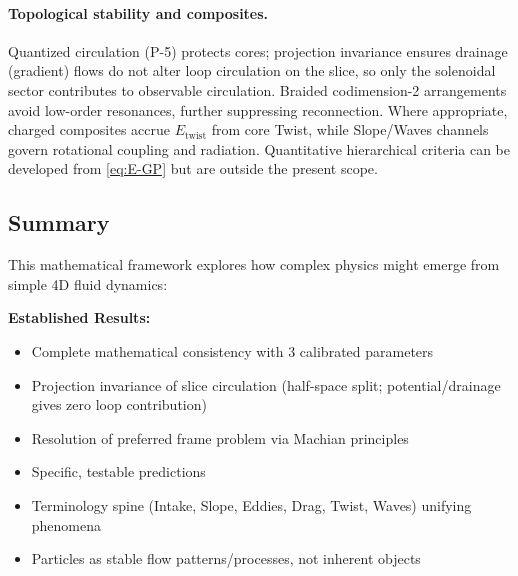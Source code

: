 \paragraph{Topological stability and composites.}
Quantized circulation (P-5) protects cores; projection invariance ensures drainage (gradient) flows do not alter loop circulation on the slice, so only the solenoidal sector contributes to observable circulation. Braided codimension-2 arrangements avoid low-order resonances, further suppressing reconnection. Where appropriate, charged composites accrue $E_{\text{twist}}$ from core Twist, while Slope/Waves channels govern rotational coupling and radiation. Quantitative hierarchical criteria can be developed from \eqref{eq:E-GP} but are outside the present scope.

\medskip
\noindent
{}
\medskip

\subsection{Summary}

This mathematical framework explores how complex physics might emerge from simple 4D fluid dynamics:

\textbf{Established Results:}
\begin{itemize}
\item Complete mathematical consistency with 3 calibrated parameters
\item Projection invariance of slice circulation (half-space split; potential/drainage gives zero loop contribution)
\item Resolution of preferred frame problem via Machian principles
\item Specific, testable predictions
\item Terminology spine (Intake, Slope, Eddies, Drag, Twist, Waves) unifying phenomena
\item Particles as stable flow patterns/processes, not inherent objects
\end{itemize}

